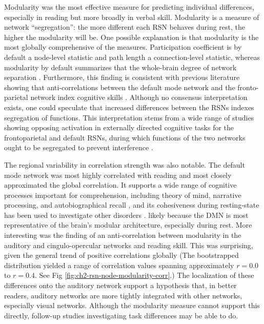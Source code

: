 Modularity was the most effective measure for predicting individual differences, especially in reading but more broadly in verbal skill. Modularity is a measure of network ``segregation'': the more different each RSN behaves during rest, the higher the modularity will be. One possible explanation is that modularity is the most globally comprehensive of the measures. Participation coefficient is by default a node-level statistic and path length a connection-level statistic, whereas modularity by default summarizes that the whole-brain degree of network separation \citep{Bullmore2012}. Furthermore, this finding is consistent with previous literature showing that anti-correlations between the default mode network and the fronto-parietal network index cognitive skills \citep{Anticevic2012}. Although no consensus interpretation exists, one could speculate that increased differences between the RSNs indexes segregation of functions. This interpretation stems from a wide range of studies showing opposing activation in externally directed cognitive tasks for the frontoparietal and default RSNs, during which functions of the two networks ought to be segregated to prevent interference \citep{Reineberg2018}.

The regional variability in correlation strength was also notable. The default mode network was most highly correlated with reading and most closely approximated the global correlation. It supports a wide range of cognitive processes important for comprehension, including theory of mind, narrative processing, and autobiographical recall \citep{Buckner2008, AbdulSabur2014}, and its cohesiveness during resting-state has been used to investigate other disorders \citep{Uddin2008}.  likely because the DMN is most representative of the brain's modular architecture, especially during rest. More interesting was the finding of an anti-correlation between modularity in the auditory and cingulo-opercular networks and reading skill. This was surprising, given the general trend of positive correlations globally (The bootstrapped distribution yielded a range of correlation values spanning approximately $r = 0.0$ to $r = 0.4$. See Fig \ref{fig:ch2-rsn-node-modularity-corr}.) The localization of these differences onto the auditory network support a hypothesis that, in better readers, auditory networks are more tightly integrated with other networks, especially visual networks. Although the modularity measure cannot support this directly, follow-up studies investigating task differences may be able to do.


